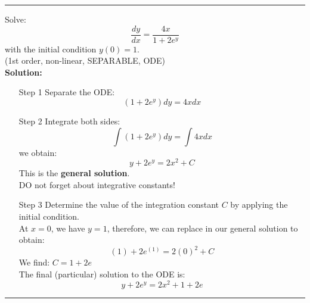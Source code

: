 \begin{center}
\noindent\rule{4cm}{0.4pt}
\end{center}

\begin{exmp}{} Solve:
\begin{equation}
\frac{dy}{dx}=\frac{4x}{1+2e^y}
\end{equation}
with the initial condition $y(0)=1$.\\
(1st order, non-linear, SEPARABLE, ODE)\\
\textbf{Solution:}
\begin{enumerate}
\item[Step 1] Separate the ODE:
\begin{equation}
\left(1+2e^y\right){dy}={4x}{dx}
\end{equation}
\item[Step 2] Integrate both sides:
\begin{equation}
\int{\left(1+2e^y\right)}{dy}=\int{{4x}}{dx}
\end{equation}
we obtain:
\begin{equation}
y+2e^y=2x^2 + C
\end{equation}
This is the \textbf{general solution}.\\
DO not forget about integrative constants!
\item[Step 3] Determine the value of the integration constant $C$ by applying the initial condition. \\
At $x=0$, we have $y=1$, therefore, we can replace in our general solution to obtain:
\begin{equation}
(1)+2e^{(1)}=2(0)^2 + C
\end{equation}
We find: $C=1+2e$\\
The final (particular) solution to the ODE is:
\begin{equation}
\boxed{y+2e^y=2x^2 + 1+2e}
\end{equation}
\end{enumerate}
\end{exmp}
\begin{center}
\noindent\rule{4cm}{0.4pt}
\end{center}

\updateinfo[September 12, 2018]
